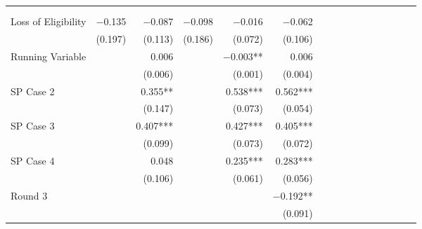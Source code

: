 \begin{tabular}{@{\extracolsep{5pt}}lrrrrrrrrrrrrrrr}
\toprule
& \multicolumn{1}{p{0.13\linewidth}}{\centering{(1)}} & \multicolumn{1}{p{0.13\linewidth}}{\centering{(2)}} & \multicolumn{1}{p{0.13\linewidth}}{\centering{(3)}} & \multicolumn{1}{p{0.13\linewidth}}{\centering{(4)}} & \multicolumn{1}{p{0.13\linewidth}}{\centering{(5)}} \\
& \multicolumn{1}{p{0.13\linewidth}}{\centering{Local Robust}} & \multicolumn{1}{p{0.13\linewidth}}{\centering{Local Linear}} & \multicolumn{1}{p{0.13\linewidth}}{\centering{Global Robust}} & \multicolumn{1}{p{0.13\linewidth}}{\centering{Global Linear}} & \multicolumn{1}{p{0.13\linewidth}}{\centering{Global Diff$-$Diff}} \\
\hline
Loss of Eligibility & $-$0.135\phantom{\phantom{)}***} & $-$0.087\phantom{\phantom{)}***} & $-$0.098\phantom{\phantom{)}***} & $-$0.016\phantom{\phantom{)}***} & $-$0.062\phantom{\phantom{)}***} \\
& (0.197)\phantom{***} & (0.113)\phantom{***} & (0.186)\phantom{***} & (0.072)\phantom{***} & (0.106)\phantom{***} \\
Running Variable & \phantom{***} & 0.006\phantom{\phantom{)}***} & \phantom{***} & $-$0.003\phantom{)}**\phantom{*} & 0.006\phantom{\phantom{)}***} \\
& \phantom{***} & (0.006)\phantom{***} & \phantom{***} & (0.001)\phantom{***} & (0.004)\phantom{***} \\
SP Case 2 & \phantom{***} & 0.355\phantom{)}**\phantom{*} & \phantom{***} & 0.538\phantom{)}*** & 0.562\phantom{)}*** \\
& \phantom{***} & (0.147)\phantom{***} & \phantom{***} & (0.073)\phantom{***} & (0.054)\phantom{***} \\
SP Case 3 & \phantom{***} & 0.407\phantom{)}*** & \phantom{***} & 0.427\phantom{)}*** & 0.405\phantom{)}*** \\
& \phantom{***} & (0.099)\phantom{***} & \phantom{***} & (0.073)\phantom{***} & (0.072)\phantom{***} \\
SP Case 4 & \phantom{***} & 0.048\phantom{\phantom{)}***} & \phantom{***} & 0.235\phantom{)}*** & 0.283\phantom{)}*** \\
& \phantom{***} & (0.106)\phantom{***} & \phantom{***} & (0.061)\phantom{***} & (0.056)\phantom{***} \\
Round 3 & \phantom{***} & \phantom{***} & \phantom{***} & \phantom{***} & $-$0.192\phantom{)}**\phantom{*} \\
& \phantom{***} & \phantom{***} & \phantom{***} & \phantom{***} & (0.091)\phantom{***} \\

\end{tabular}
